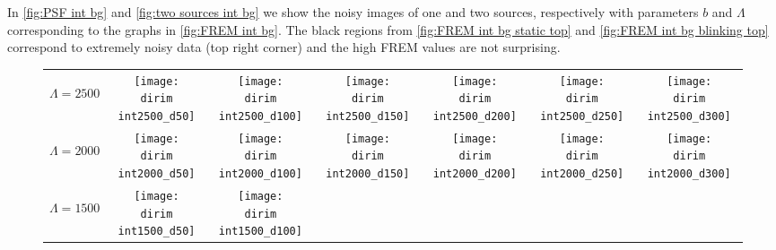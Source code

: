In \autoref{fig:PSF int bg} and \ref{fig:two sources int bg} we show the noisy images of one and two sources, respectively with parameters $b$ and $\Lambda$ corresponding to the graphs in \autoref{fig:FREM int bg}.  The black regions from \autoref{fig:FREM int bg static top} and \autoref{fig:FREM int bg blinking top} correspond to extremely noisy data (top right corner) and the high FREM values are not surprising. 


\begin{figure}[!bt]
	\centering
	\newcommand{\wf}{.13\textwidth}
	\newcommand{\dirim}{\qd gFREM/images/psf3/text_twosources_}
	\newcommand{\vs}{.1}
	\begin{tabular}{c|cccccc}
		\begin{sideways}\hspace{\vs cm}$\Lambda=2500$\end{sideways}
		&\texttt{[image: \\dirim int2500\_d50]}
		&\texttt{[image: \\dirim int2500\_d100]}
		&\texttt{[image: \\dirim int2500\_d150]}
		&\texttt{[image: \\dirim int2500\_d200]}
		&\texttt{[image: \\dirim int2500\_d250]}
		&\texttt{[image: \\dirim int2500\_d300]}\\
		\begin{sideways}\hspace{\vs cm}$\Lambda=2000$\end{sideways}
		&\texttt{[image: \\dirim int2000\_d50]}
		&\texttt{[image: \\dirim int2000\_d100]}
		&\texttt{[image: \\dirim int2000\_d150]}
		&\texttt{[image: \\dirim int2000\_d200]}
		&\texttt{[image: \\dirim int2000\_d250]}
		&\texttt{[image: \\dirim int2000\_d300]}\\
		\begin{sideways}\hspace{\vs cm}$\Lambda=1500$\end{sideways}
		&\texttt{[image: \\dirim int1500\_d50]}
		&\texttt{[image: \\dirim int1500\_d100]}

\end{tabular}
\end{figure}
